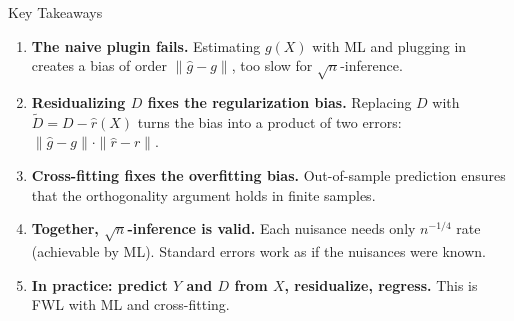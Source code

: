 \documentclass[aspectratio=169, 11pt, handout]{beamer}
\begin{document}
\begin{frame}{Key Takeaways}

\begin{enumerate}
    \item \textbf{The naive plugin fails.} Estimating $g(X)$ with ML and plugging in creates a bias of order $\|\hat{g} - g\|$, too slow for $\sqrt{n}$-inference.

    \pause\bigskip

    \item \textbf{Residualizing $D$ fixes the regularization bias.} Replacing $D$ with $\tilde{D} = D - \hat{r}(X)$ turns the bias into a product of two errors: $\|\hat{g} - g\| \cdot \|\hat{r} - r\|$.

    \pause\bigskip

    \item \textbf{Cross-fitting fixes the overfitting bias.} Out-of-sample prediction ensures that the orthogonality argument holds in finite samples.

    \pause\bigskip

    \item \textbf{Together, $\sqrt{n}$-inference is valid.} Each nuisance needs only $n^{-1/4}$ rate (achievable by ML). Standard errors work as if the nuisances were known.

    \pause\bigskip

    \item \textbf{In practice: predict $Y$ and $D$ from $X$, residualize, regress.} This is FWL with ML and cross-fitting.

\end{enumerate}

\end{frame}
\end{document}
